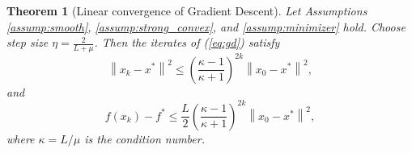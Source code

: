 \documentclass[11pt]{article}
\newtheorem{theorem}{Theorem}
\newcommand{\norm}[1]{\left\|#1\right\|}
\begin{document}
\begin{theorem}[Linear convergence of Gradient Descent] \label{thm:gd_convergence}
    Let Assumptions \ref{assump:smooth}, \ref{assump:strong_convex}, and \ref{assump:minimizer} hold. Choose step size $\eta = \frac{2}{L + \mu}$. Then the iterates of (\ref{eq:gd}) satisfy
    \begin{equation}
        \norm{x_k - x^*}^2 \le \left( \frac{\kappa - 1}{\kappa + 1} \right)^{2k} \norm{x_0 - x^*}^2,
        \label{eq:iterate_convergence}
    \end{equation}
    and
    \begin{equation}
        f(x_k) - f^* \le \frac{L}{2} \left( \frac{\kappa - 1}{\kappa + 1} \right)^{2k} \norm{x_0 - x^*}^2,
        \label{eq:function_convergence}
    \end{equation}
    where $\kappa = L/\mu$ is the condition number.
\end{theorem}
\end{document}
